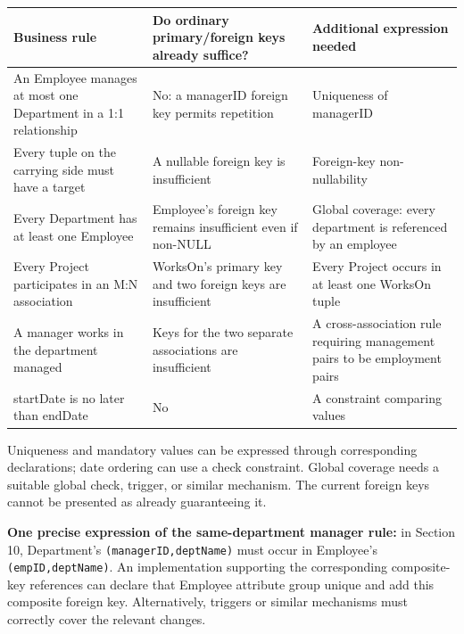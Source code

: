 \begin{longtable}[]{@{}
  >{\raggedright\arraybackslash}p{}
  >{\raggedright\arraybackslash}p{}
  >{\raggedright\arraybackslash}p{}@{}}
\toprule\noalign{}
\begin{minipage}[b]{\linewidth}\raggedright
Business rule
\end{minipage} & \begin{minipage}[b]{\linewidth}\raggedright
Do ordinary primary/foreign keys already suffice?
\end{minipage} & \begin{minipage}[b]{\linewidth}\raggedright
Additional expression needed
\end{minipage} \\
\midrule\noalign{}
\endhead
\bottomrule\noalign{}
\endlastfoot
An Employee manages at most one Department in a 1:1 relationship & No: a managerID foreign key permits repetition & Uniqueness of managerID \\
Every tuple on the carrying side must have a target & A nullable foreign key is insufficient & Foreign-key non-nullability \\
Every Department has at least one Employee & Employee's foreign key remains insufficient even if non-NULL & Global coverage: every department is referenced by an employee \\
Every Project participates in an M:N association & WorksOn's primary key and two foreign keys are insufficient & Every Project occurs in at least one WorksOn tuple \\
A manager works in the department managed & Keys for the two separate associations are insufficient & A cross-association rule requiring management pairs to be employment pairs \\
startDate is no later than endDate & No & A constraint comparing values \\
\end{longtable}

Uniqueness and mandatory values can be expressed through corresponding declarations; date ordering can use a check constraint. Global coverage needs a suitable global check, trigger, or similar mechanism. The current foreign keys cannot be presented as already guaranteeing it.

\textbf{One precise expression of the same-department manager rule:} in Section 10, Department's \texttt{(\allowbreak{}managerID,\allowbreak{}deptName)\allowbreak{}} must occur in Employee's \texttt{(\allowbreak{}empID,\allowbreak{}deptName)\allowbreak{}}. An implementation supporting the corresponding composite-key references can declare that Employee attribute group unique and add this composite foreign key. Alternatively, triggers or similar mechanisms must correctly cover the relevant changes.

